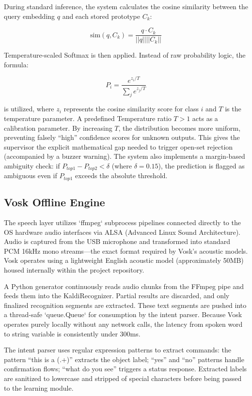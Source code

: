 \documentclass[12pt,a4paper]{report}
\begin{document}
During standard inference, the system calculates the cosine similarity between the query embedding $q$ and each stored prototype $C_k$:

\begin{equation}
    \text{sim}(q, C_k) = \frac{q \cdot C_k}{||q|| ||C_k||}
\end{equation}

\noindent
Temperature-scaled Softmax is then applied. Instead of raw probability logic, the formula:

\begin{equation}
    P_i = \frac{e^{z_i / T}}{\sum_{j} e^{z_j / T}}
\end{equation}

\noindent
is utilized, where $z_i$ represents the cosine similarity score for class $i$ and $T$ is the temperature parameter. A predefined Temperature ratio $T > 1$ acts as a calibration parameter. By increasing $T$, the distribution becomes more uniform, preventing falsely ``high'' confidence scores for unknown outputs. This gives the supervisor the explicit mathematical gap needed to trigger open-set rejection (accompanied by a buzzer warning). The system also implements a margin-based ambiguity check: if $P_{top1} - P_{top2} < \delta$ (where $\delta = 0.15$), the prediction is flagged as ambiguous even if $P_{top1}$ exceeds the absolute threshold.

\subsection{Vosk Offline Engine}
The speech layer utilizes `ffmpeg` subprocess pipelines connected directly to the OS hardware audio interfaces via ALSA (Advanced Linux Sound Architecture). Audio is captured from the USB microphone and transformed into standard PCM 16kHz mono streams---the exact format required by Vosk's acoustic models. Vosk operates using a lightweight English acoustic model (approximately 50MB) housed internally within the project repository.

A Python generator continuously reads audio chunks from the FFmpeg pipe and feeds them into the KaldiRecognizer. Partial results are discarded, and only finalized recognition segments are extracted. These text segments are pushed into a thread-safe `queue.Queue` for consumption by the intent parser. Because Vosk operates purely locally without any network calls, the latency from spoken word to string variable is consistently under 300ms.

The intent parser uses regular expression patterns to extract commands: the pattern ``this is a (.+)'' extracts the object label; ``yes'' and ``no'' patterns handle confirmation flows; ``what do you see'' triggers a status response. Extracted labels are sanitized to lowercase and stripped of special characters before being passed to the learning module.
\end{document}
